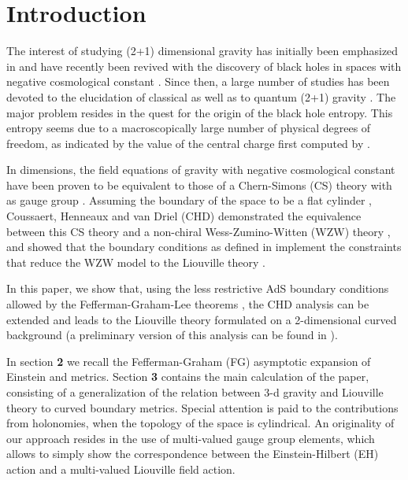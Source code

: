 \documentclass[a4paper,10pt]{article}
\begin{document}
\section{Introduction} 
 
The interest of studying (2+1) dimensional gravity has initially been  
emphasized in \cite{DJH} and have recently been revived with the discovery  
of black holes in spaces with negative cosmological constant \cite{BTZ}. 
Since then, a large number of studies has been devoted to the elucidation 
of classical as well as to quantum (2+1) gravity \cite{CAR}. The major problem 
resides in the quest for the origin of the black hole entropy. This entropy  
seems due to a macroscopically large number of physical degrees of freedom, 
as  
indicated by the value of the central charge first computed by \cite{BH}. 
 
In \coordHE{} dimensions, the field equations of gravity 
with negative cosmological constant have been proven to be equivalent  
to those of a Chern-Simons  
(CS) theory with \coordHE{} as gauge group \cite{ATW}. 
Assuming the boundary of the space to be a flat cylinder \coordHE{},  
Coussaert, Henneaux and van Driel (CHD) \cite{CHD} demonstrated  
the equivalence  
between this CS theory and a non-chiral Wess-Zumino-Witten (WZW) 
theory \cite{MS,EMSS}, and showed that the \coordHE{} boundary conditions as defined  
in \cite{BH} implement the constraints 
that reduce the WZW model to the Liouville theory \cite{FWB}. 
  
In this paper, we show that, using the less restrictive 
AdS boundary conditions allowed by the Fefferman-Graham-Lee 
theorems \cite{GL,FG}, the CHD analysis can be extended and leads 
to the Liouville theory formulated on a 2-dimensional curved background (a 
preliminary version of this analysis can be found in \cite{RS}). 

In section {\bf 2} we recall
the Fefferman-Graham (FG) asymptotic expansion of Einstein
and  \coordHE{} metrics. Section {\bf 3} contains the main calculation of
the paper, consisting of a generalization of the relation between
3-d gravity and Liouville theory to curved boundary metrics. Special attention
is paid to the contributions from holonomies, when the topology of the
space is cylindrical. An originality of our approach 
resides in the use of  multi-valued gauge group elements,
which allows to simply show
the correspondence between the Einstein-Hilbert (EH) 
action and a
multi-valued Liouville field action.
 
\end{document}
